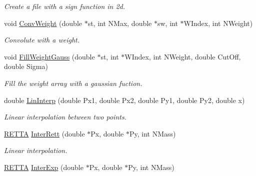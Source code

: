 \begin{DoxyCompactItemize}
\begin{DoxyCompactList}\small\item\em Create a file with a sign function in 2d. \end{DoxyCompactList}\item 
void \hyperlink{classMatematica_aeb09a568715afc74c567fe165fe2580d}{Conv\+Weight} (double $\ast$st, int N\+Max, double $\ast$sw, int $\ast$W\+Index, int N\+Weight)\hypertarget{classMatematica_aeb09a568715afc74c567fe165fe2580d}{}\label{classMatematica_aeb09a568715afc74c567fe165fe2580d}

\begin{DoxyCompactList}\small\item\em Convolute with a weight. \end{DoxyCompactList}\item 
void \hyperlink{classMatematica_a38e3b43d1950bf097523b3b9e5bfb69b}{Fill\+Weight\+Gauss} (double $\ast$st, int $\ast$W\+Index, int N\+Weight, double Cut\+Off, double Sigma)\hypertarget{classMatematica_a38e3b43d1950bf097523b3b9e5bfb69b}{}\label{classMatematica_a38e3b43d1950bf097523b3b9e5bfb69b}

\begin{DoxyCompactList}\small\item\em Fill the weight array with a gaussian fuction. \end{DoxyCompactList}\item 
double \hyperlink{classMatematica_aa0b83812f24967b127cbd0b508d8ed95}{Lin\+Interp} (double Px1, double Px2, double Py1, double Py2, double x)\hypertarget{classMatematica_aa0b83812f24967b127cbd0b508d8ed95}{}\label{classMatematica_aa0b83812f24967b127cbd0b508d8ed95}

\begin{DoxyCompactList}\small\item\em Linear interpolation between two points. \end{DoxyCompactList}\item 
\hyperlink{structRETTA}{R\+E\+T\+TA} \hyperlink{classMatematica_a704c5213772cd3d9fd7dd77d74461bf2}{Inter\+Rett} (double $\ast$Px, double $\ast$Py, int N\+Mass)\hypertarget{classMatematica_a704c5213772cd3d9fd7dd77d74461bf2}{}\label{classMatematica_a704c5213772cd3d9fd7dd77d74461bf2}

\begin{DoxyCompactList}\small\item\em Linear interpolation. \end{DoxyCompactList}\item 
\hyperlink{structRETTA}{R\+E\+T\+TA} \hyperlink{classMatematica_a54633464985cd9a4864e2d0245fa231c}{Inter\+Exp} (double $\ast$Px, double $\ast$Py, int N\+Mass)\hypertarget{classMatematica_a54633464985cd9a4864e2d0245fa231c}{}\label{classMatematica_a54633464985cd9a4864e2d0245fa231c}


\end{DoxyCompactItemize}
